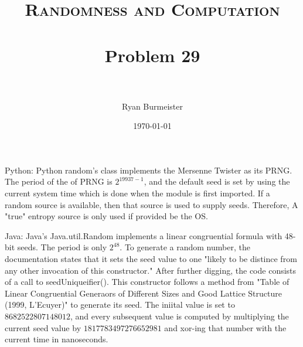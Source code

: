 \documentclass[fontsize=12pt]{article}
\title{ 
  \normalfont \normalsize 
  \textsc{Randomness and Computation} \\ [25pt] %
  \horrule{0.5pt} \\[0.4cm] %
  \huge Problem 29 \\ %
  \horrule{2pt} \\[0.5cm] %
}
\author{Ryan Burmeister} %
\date{\normalsize\today} %
\numberwithin{equation}{section} %
\numberwithin{figure}{section} %
\numberwithin{table}{section} %
\begin{document}
\maketitle %

Python:
Python random's class implements the Mersenne Twister as its PRNG.  The period
of the of PRNG is $2^{19937-1}$, and the default seed is set by using the
current system time which is done when the module is first imported.  If a
random source is available, then that source is used to supply seeds.
Therefore, A "true" entropy source is only used if provided be the OS. 

Java:
Java's Java.util.Random implements a linear congruential formula with
48-bit seeds.  The period is only $2^48$.  To generate a random number,
the documentation states that it sets the seed value to one "likely to
be distince from any other invocation of this constructor."  After further
digging, the code consists of a call to seedUniqueifier().  This constructor
follows a method from "Table of Linear Congruential Generaors of Different
Sizes and Good Lattice Structure (1999, L'Ecuyer)" to generate its seed.
The iniital value is set to $8682522807148012$, and every subsequent value
is computed by multiplying the current seed value by $1817783497276652981$ and
xor-ing that number with the current time in nanoseconds.
\end{document}
